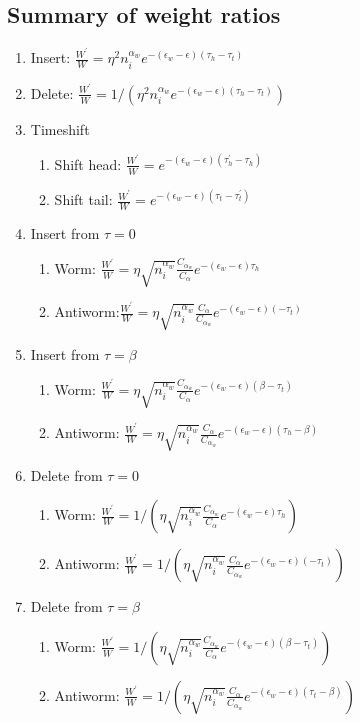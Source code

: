 \documentclass[12pt, two sided]{article}
\begin{document}
	\subsection{Summary of weight ratios}	
    \begin{enumerate}
        \setcounter{enumi}{0}
    \item Insert:  $\frac{W^\prime}{W}= \eta^2 n_i^{\alpha_w} e^{-(\epsilon_w-\epsilon)(\tau_h-\tau_t)}$
    \item Delete: $\frac{W^\prime}{W}= 1/(\eta^2 n_i^{\alpha_w} e^{-(\epsilon_w-\epsilon)(\tau_h-\tau_t)})$
    \item Timeshift
    	\begin{enumerate}
	\item{Shift head: $\frac{W^\prime}{W}=e^{-(\epsilon_w-\epsilon)(\tau_h^\prime-\tau_h)}$}
	\item{Shift tail: $\frac{W^\prime}{W}=e^{-(\epsilon_w-\epsilon)(\tau_t-\tau_t^\prime)}$}
	\end{enumerate}
    \item Insert from $\tau=0$
    	\begin{enumerate}
	\item{Worm: $\frac{W^\prime}{W}= \eta \sqrt{n_i^{\alpha_w}} \frac{C_{\alpha_w}}{C_{\alpha}}e^{-(\epsilon_w-\epsilon)\tau_h}$ }
	\item{Antiworm:$\frac{W^\prime}{W}= \eta \sqrt{n_i^{\alpha_w}} \frac{C_{\alpha}}{C_{\alpha_w}}e^{-(\epsilon_w-\epsilon)(-\tau_t)}$ }
	\end{enumerate}
    \item Insert from $\tau=\beta$
    	\begin{enumerate}
	\item{Worm: $\frac{W^\prime}{W}= \eta \sqrt{n_i^{\alpha_w}} \frac{C_{\alpha_w}}{C_{\alpha}}e^{-(\epsilon_w-\epsilon)(\beta-\tau_t)}$}
	\item{Antiworm: $\frac{W^\prime}{W}= \eta \sqrt{n_i^{\alpha_w}} \frac{C_{\alpha}}{C_{\alpha_w}}e^{-(\epsilon_w-\epsilon)(\tau_h - \beta)}$}
	\end{enumerate}
    \item Delete from $\tau=0$
    	\begin{enumerate}
	\item{Worm: $\frac{W^\prime}{W}= 1/(\eta \sqrt{n_i^{\alpha_w}} \frac{C_{\alpha_w}}{C_{\alpha}}e^{-(\epsilon_w-\epsilon)\tau_h})$}
	\item{Antiworm: $\frac{W^\prime}{W}= 1/(\eta \sqrt{n_i^{\alpha_w}} \frac{C_{\alpha}}{C_{\alpha_w}}e^{-(\epsilon_w-\epsilon)(-\tau_t)}) $}
	\end{enumerate}
    \item Delete from $\tau=\beta$
    	\begin{enumerate}
	\item{Worm: $\frac{W^\prime}{W}= 1/( \eta \sqrt{n_i^{\alpha_w}} \frac{C_{\alpha_w}}{C_{\alpha}}e^{-(\epsilon_w-\epsilon)(\beta-\tau_t)})$}
	\item{Antiworm: $\frac{W^\prime}{W}= 1/(\eta \sqrt{n_i^{\alpha_w}} \frac{C_{\alpha}}{C_{\alpha_w}}e^{-(\epsilon_w-\epsilon)(\tau_t - \beta)})$}
	\end{enumerate}
    \end{enumerate}
\end{document}

